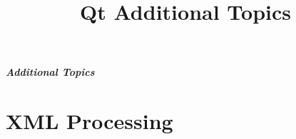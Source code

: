\documentclass[t]{beamer}
\title{Qt Additional Topics}
\begin{document}


\setcounter{tocdepth}{2} %
\begin{frame}
  \frametitle{Additional Topics}
  \tableofcontents[part=1]
  \vspace{108pt}
\end{frame}

\setcounter{tocdepth}{3} %

\part{XML Processing}



\end{document}
